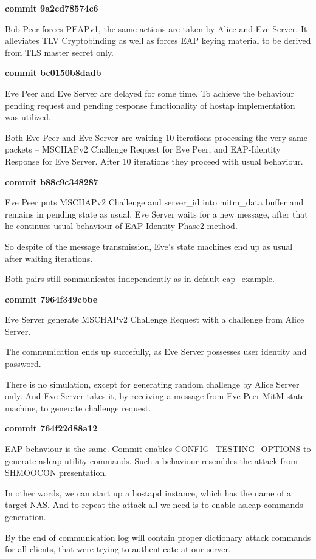 \documentclass{amsart}
\begin{document}
\textbf{commit 9a2cd78574c6}

Bob Peer forces PEAPv1, the same actions are taken
by Alice and Eve Server. It alleviates TLV Cryptobinding
as well as forces EAP keying material to be derived
from TLS master secret only.

\textbf{commit bc0150b8dadb}

Eve Peer and Eve Server are delayed for some time.
To achieve the behaviour pending request and pending response
functionality of hostap implementation was utilized.

Both Eve Peer and Eve Server are waiting 10 iterations
processing the very same packets -- MSCHAPv2 Challenge Request
for Eve Peer,
and EAP-Identity Response for Eve Server.
After 10 iterations they proceed with usual behaviour.

\textbf{commit b88c9c348287}

Eve Peer puts MSCHAPv2 Challenge and server\_id into mitm\_data
buffer and remains in pending state as usual.
Eve Server waits for a new message,
after that he continues usual behaviour of EAP-Identity Phase2 method.

So despite of the message transmission,
Eve's state machines end up as usual after waiting iterations.

Both pairs still communicates independently as in default eap\_example.

\textbf{commit 7964f349cbbe}

Eve Server generate MSCHAPv2 Challenge Request with a challenge
from Alice Server.

The communication ends up succefully, as Eve Server possesses
user identity and password.

There is no simulation, except for generating random challenge
by Alice Server only. And Eve Server takes it, by receiving
a message from Eve Peer MitM state machine, to generate
challenge request.

\textbf{commit  764f22d88a12}

EAP behaviour is the same. Commit enables CONFIG\_TESTING\_OPTIONS
to generate asleap utility commands. Such a behaviour
resembles the attack from SHMOOCON presentation.

In other words, we can start up a hostapd instance, which
has the name of a target NAS. And to repeat the attack
all we need is to enable asleap commands generation.

By the end of communication log will contain proper
dictionary attack commands for all clients, that
were trying to authenticate at our server.
\end{document}
